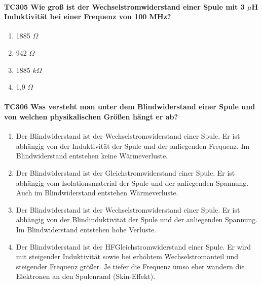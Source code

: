 \documentclass[8pt]{article}
\begin{document}
\begin{enumerate}
\begin{enumerate}[nolistsep,label=\Alph*]
{\paragraph*{TC305 Wie groß ist der Wechselstromwiderstand einer Spule mit 3 $\mu$H Induktivität bei einer Frequenz von 100 MHz?}
\begin{enumerate}[nolistsep,label=\Alph*]
\item 1885 $\Omega$
\item 942 $\Omega$
\item 1885 $k\Omega$
\item 1,9 $\Omega$
\end{enumerate}

\paragraph*{TC306 Was versteht man unter dem Blindwiderstand einer Spule und von welchen physikalischen Größen hängt er ab?}
\begin{enumerate}[nolistsep,label=\Alph*]
\item Der Blindwiderstand ist der Wechselstromwiderstand einer Spule. Er ist abhängig von der Induktivität der Spule und der anliegenden Frequenz. Im Blindwiderstand entstehen keine Wärmeverluste.
\item Der Blindwiderstand ist der Gleichstromwiderstand einer Spule. Er ist abhängig vom Isolationsmaterial der Spule und der anliegenden Spannung. Auch im Blindwiderstand entstehen Wärmeverluste.
\item Der Blindwiderstand ist der Wechselstromwiderstand einer Spule. Er ist abhängig von der Blindinduktivität der Spule und der anliegenden Spannung. Im Blindwiderstand entstehen hohe Verluste.
\item Der Blindwiderstand ist der HFGleichstromwiderstand einer Spule. Er wird mit steigender Induktivität sowie bei erhöhtem Wechselstromanteil und steigender Frequenz größer. Je tiefer die Frequenz umso eher wandern die Elektronen an den Spulenrand (Skin-Effekt).
\end{enumerate}

}
\end{enumerate}
\end{enumerate}
\end{document}

